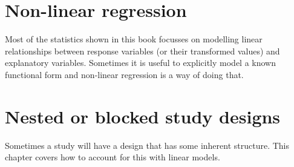 \documentclass[
  a4paperpaper,
]{book}
\begin{document}
\hypertarget{non-linear-regression}{%
\section{Non-linear regression}\label{non-linear-regression}}

Most of the statistics shown in this book focusses on modelling linear relationships between response variables (or their transformed values) and explanatory variables. Sometimes it is useful to explicitly model a known functional form and non-linear regression is a way of doing that.

\hypertarget{nested-or-blocked-study-designs}{%
\section{Nested or blocked study designs}\label{nested-or-blocked-study-designs}}

Sometimes a study will have a design that has some inherent structure. This chapter covers how to account for this with linear models.

  
\end{document}
